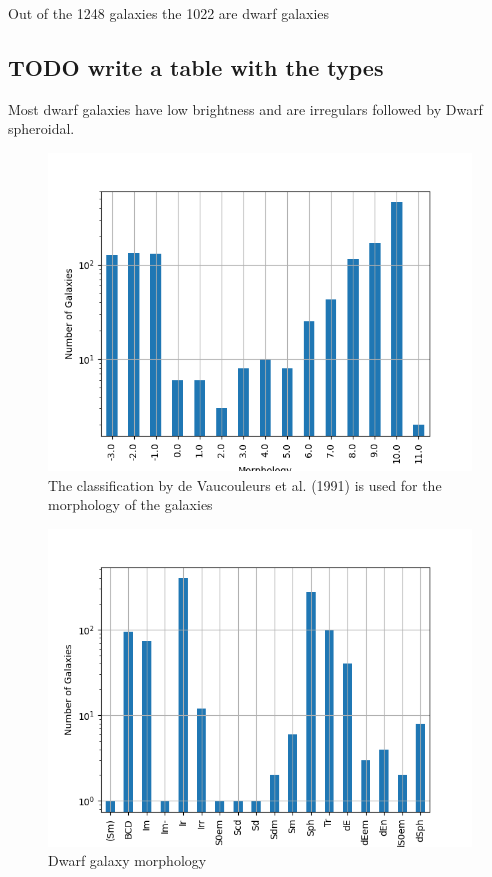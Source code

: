 \documentclass[a4paper,twocolumn]{article}
\begin{document}
Out of the 1248 galaxies the 1022 are dwarf galaxies

\subsection{{\bfseries\sffamily TODO} write a table with the types}
\label{sec:org421f46e}

Most dwarf galaxies have low brightness and are irregulars followed by Dwarf spheroidal.

\begin{figure}[htbp]
\centering
\includegraphics[width=.9\linewidth]{./figs/hist-Type.png}
\caption{\label{Types of galaxies}The classification by de Vaucouleurs et al. (1991) is used for the morphology of the galaxies}
\end{figure}

\begin{figure}[htbp]
\centering
\includegraphics[width=.9\linewidth]{./figs/hist-Tdw1.png}
\caption{\label{Types of dwarf galaxies}Dwarf galaxy morphology}
\end{figure}
\end{document}

